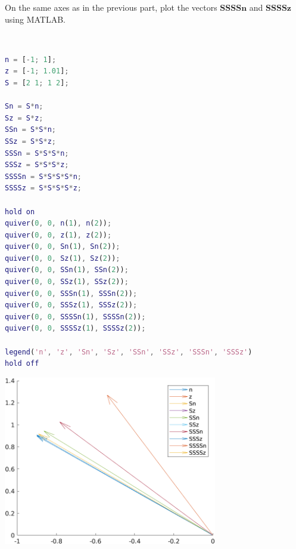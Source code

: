 On the same axes as in the previous part, plot the vectors $\boldsymbol{SSSSn}$ and $\boldsymbol{SSSSz}$ using MATLAB.

\begin{solution} \
    \begin{lstlisting}[language=Matlab]
n = [-1; 1];
z = [-1; 1.01];
S = [2 1; 1 2];

Sn = S*n;
Sz = S*z;
SSn = S*S*n;
SSz = S*S*z;
SSSn = S*S*S*n;
SSSz = S*S*S*z;
SSSSn = S*S*S*S*n;
SSSSz = S*S*S*S*z;

hold on
quiver(0, 0, n(1), n(2));
quiver(0, 0, z(1), z(2));
quiver(0, 0, Sn(1), Sn(2));
quiver(0, 0, Sz(1), Sz(2));
quiver(0, 0, SSn(1), SSn(2));
quiver(0, 0, SSz(1), SSz(2));
quiver(0, 0, SSSn(1), SSSn(2));
quiver(0, 0, SSSz(1), SSSz(2));
quiver(0, 0, SSSSn(1), SSSSn(2));
quiver(0, 0, SSSSz(1), SSSSz(2));

legend('n', 'z', 'Sn', 'Sz', 'SSn', 'SSz', 'SSSn', 'SSSz')
hold off
    \end{lstlisting}
    \begin{center}
        \includegraphics[width=0.7\textwidth]{img/e8p5.png}
    \end{center}
\end{solution}